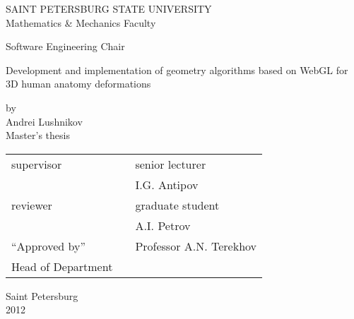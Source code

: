 \thispagestyle{empty}
\begin{center}
SAINT PETERSBURG STATE UNIVERSITY\\
Mathematics \& Mechanics Faculty\\
\end{center}
\begin{center}
Software Engineering Chair\\
\end{center}
\vspace{2cm}
\begin{center}
    \Large{Development and implementation of geometry algorithms based on WebGL
    for 3D human anatomy deformations} \\
\end{center}
\vspace{1cm}
\begin{center}
    \normalsize{by} \\
    \large{Andrei Lushnikov}\\
    \large{Master’s thesis}
\end{center}
\vspace{3cm}
\noindent
\begin{center}
    \small
    \begin{tabular}{lcl}
        supervisor & \dotuline{\phantom{кошерная подпись}} & senior lecturer\\
        & & I.G. Antipov \\
        reviewer & \dotuline{\phantom{кошерная подпись}} & graduate student \\
        & & A.I. Petrov \\
        ``Approved by'' & \dotuline{\phantom{кошерная подпись}} & Professor A.N.
        Terekhov\\
        Head of Department & & \\
    \end{tabular}
\end{center}
\vspace{\fill}
\begin{center}
    \small
    Saint Petersburg\\2012
\end{center}
\pagebreak

